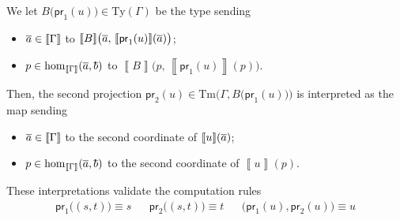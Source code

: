 \documentclass{article}
\theoremstyle{definition}
\renewcommand{\int}[1]{\mathopen{}\left\llbracket #1
    \right\rrbracket\mathclose{}}       %
\newcommand{\tproj}{\mathsf{pr}}
\newcommand{\Ty}{\mathrm{Ty}}
\newcommand{\Tm}{\mathrm{Tm}}
\renewcommand{\hom}[3][]{\mathrm{hom}_{#1}\mathopen{}\left( #2, #3 \right)\mathclose{}}
\newcommand{\tup}[1]{\overline{\smash{#1}\vphantom{a}}}
\begin{document}
We let $B \big( \tproj_1(u) \big) \in \Ty(\Gamma)$ be the type sending
\begin{itemize}
    \item $\tup{a} \in \int{\Gamma}$ to $\int{B} \big( \tup{a},\, \int{\tproj_1(u)}(\tup{a}) \big)$;
    
    \item $p \in \hom[\int{\Gamma}]{\tup{a}}{\tup{b}}$ to $\int{B} \big( p,\, \int{\tproj_1(u)}(p) \big)$.
\end{itemize}
Then, the second projection $\tproj_2(u) \in \Tm \Big( \Gamma, B \big( \tproj_1(u) \big) \Big)$ is interpreted as the map sending
\begin{itemize}
    \item $\tup{a} \in \int{\Gamma}$ to the second coordinate of $\int{u}(\tup{a})$;
    
    \item $p \in \hom[\int{\Gamma}]{\tup{a}}{\tup{b}}$ to the second coordinate of $\int{u}(p)$.
\end{itemize}

These interpretations validate the computation rules
\begin{align*}
    \tproj_1 \big( (s,t) \big) \equiv s & & \tproj_2 \big( (s,t) \big) \equiv t & & \big( \tproj_1(u), \tproj_2(u) \big) \equiv u
\end{align*}
\end{document}

